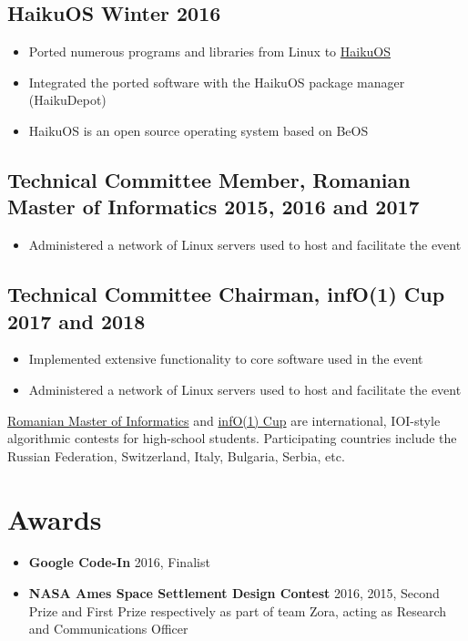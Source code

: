 \documentclass[a4paper]{article}
\begin{document}
\subsection*{HaikuOS \hfill Winter 2016}
\begin{itemize}
	\item Ported numerous programs and libraries from Linux to
	      \href{https://www.haiku-os.org/}{HaikuOS}
	\item Integrated the ported software with the HaikuOS package manager
	      (HaikuDepot)
	\item HaikuOS is an open source operating system based on BeOS
\end{itemize}

\subsection*{Technical Committee Member, Romanian Master of Informatics \hfill
	2015, 2016 and 2017}
\begin{itemize}
	\item Administered a network of Linux servers used to host and facilitate
	      the event
\end{itemize}

\subsection*{Technical Committee Chairman, infO(1) Cup \hfill 2017 and 2018}
\begin{itemize}
	\item Implemented extensive functionality to core software used in the event
	\item Administered a network of Linux servers used to host and facilitate
	      the event
\end{itemize}

\vspace{5pt}
\href{http://rmi.lbi.ro}{Romanian Master of Informatics} and \href{http://info1cup.com/}{infO(1) Cup} are international, IOI-style
algorithmic contests for high-school students. Participating countries include
the Russian Federation, Switzerland, Italy, Bulgaria, Serbia, etc.

\section*{Awards}

\begin{itemize}
	\item \textbf{Google Code-In} 2016, Finalist
	\item \textbf{NASA Ames Space Settlement Design Contest} 2016, 2015, Second Prize and First
	      Prize respectively as part of team Zora, acting as Research and
	      Communications Officer
\end{itemize}
\end{document}
